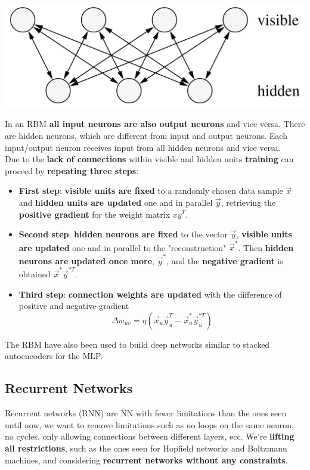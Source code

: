 \documentclass[11pt]{article}
\begin{document}
		\begin{center}
			\includegraphics[width=0.65\linewidth]{img/NN/RBM1}
		\end{center}
		
		In an RBM \textbf{all input neurons are also output neurons} and vice versa. There are hidden neurons, which are different from input and output neurons. Each input/output neuron receives input from all hidden neurons and vice versa.\\
		
		Due to the \textbf{lack of connections} within visible and hidden units \textbf{training} can proceed by \textbf{repeating three steps}: 
		\begin{itemize}
			\item \textbf{First step}: \textbf{visible units are fixed} to a randomly chosen data sample $\vec{x}$ and \textbf{hidden units are updated} one and in parallel $\vec{y}$, retrieving the \textbf{positive gradient} for the weight matrix $xy^T$.\\
			
			\item \textbf{Second step}: \textbf{hidden neurons are fixed} to the vector $\vec{y}$, \textbf{visible units are updated} one and in parallel to the "reconstruction" $\vec{x}^\ast$. Then \textbf{hidden neurons are updated once more}, $\vec{y}^\ast$, and the \textbf{negative gradient} is obtained $\vec{x}^\ast \vec{y}^{\ast T}$.\\
			
			\item \textbf{Third step}: \textbf{connection weights are updated} with the difference of positive and negative gradient
			$$ \Delta w_{uv} = \eta \left( \vec{x}_u \vec{y}_u^T - \vec{x}^\ast_u \vec{y}^{\ast T}_u \right)$$
		\end{itemize}
		
		The RBM have also been used to build deep networks similar to stacked autoencoders for the MLP.\\
		
		
		\subsection{Recurrent Networks}
		Recurrent networks (RNN) are NN with fewer limitations than the ones seen until now, we want to remove limitations such as no loops on the same neuron, no cycles, only allowing connections between different layers, ecc. We're \textbf{lifting all restrictions}, such as the ones seen for Hopfield networks and Boltzmann machines, and considering \textbf{recurrent networks without any constraints}.\\
		
\end{document}
